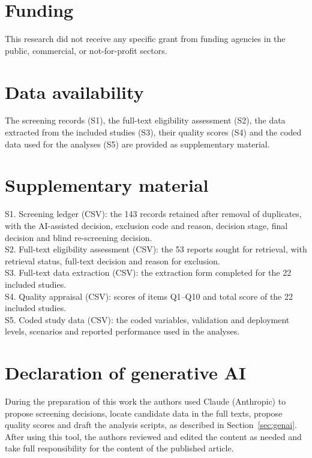 \documentclass[preprint,12pt]{elsarticle}
\begin{document}
\section*{Funding}
This research did not receive any specific grant from funding agencies in the public, commercial, or not-for-profit sectors.

\section*{Data availability}
The screening records (S1), the full-text eligibility assessment (S2), the data extracted from the included studies (S3), their quality scores (S4) and the coded data used for the analyses (S5) are provided as supplementary material.

\section*{Supplementary material}
\noindent S1. Screening ledger (CSV): the 143 records retained after removal of duplicates, with the AI-assisted decision, exclusion code and reason, decision stage, final decision and blind re-screening decision.\\
S2. Full-text eligibility assessment (CSV): the 53 reports sought for retrieval, with retrieval status, full-text decision and reason for exclusion.\\
S3. Full-text data extraction (CSV): the extraction form completed for the 22 included studies.\\
S4. Quality appraisal (CSV): scores of items Q1--Q10 and total score of the 22 included studies.\\
S5. Coded study data (CSV): the coded variables, validation and deployment levels, scenarios and reported performance used in the analyses.

\section*{Declaration of generative AI}
During the preparation of this work the authors used Claude (Anthropic) to propose screening decisions, locate candidate data in the full texts, propose quality scores and draft the analysis scripts, as described in Section~\ref{sec:genai}. After using this tool, the authors reviewed and edited the content as needed and take full responsibility for the content of the published article.

\appendix
\end{document}

